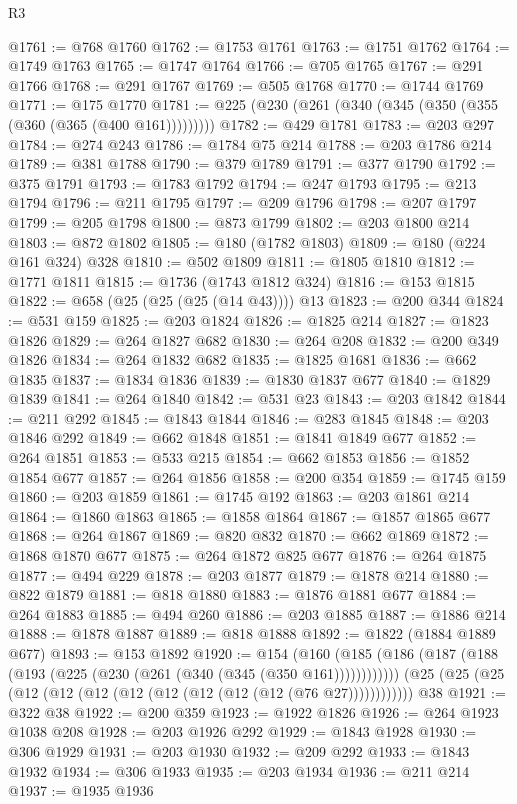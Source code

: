 \begin{lexlean}{R3}
\begin{coremodule}
@1761 := @768 @1760
@1762 := @1753 @1761
@1763 := @1751 @1762
@1764 := @1749 @1763
@1765 := @1747 @1764
@1766 := @705 @1765
@1767 := @291 @1766
@1768 := @291 @1767
@1769 := @505 @1768
@1770 := @1744 @1769
@1771 := @175 @1770
@1781 := @225 (@230 (@261 (@340 (@345 (@350 (@355 (@360 (@365 (@400 @161)))))))))
@1782 := @429 @1781
@1783 := @203 @297
@1784 := @274 @243
@1786 := @1784 @75 @214
@1788 := @203 @1786 @214
@1789 := @381 @1788
@1790 := @379 @1789
@1791 := @377 @1790
@1792 := @375 @1791
@1793 := @1783 @1792
@1794 := @247 @1793
@1795 := @213 @1794
@1796 := @211 @1795
@1797 := @209 @1796
@1798 := @207 @1797
@1799 := @205 @1798
@1800 := @873 @1799
@1802 := @203 @1800 @214
@1803 := @872 @1802
@1805 := @180 (@1782 @1803)
@1809 := @180 (@224 @161 @324) @328
@1810 := @502 @1809
@1811 := @1805 @1810
@1812 := @1771 @1811
@1815 := @1736 (@1743 @1812 @324)
@1816 := @153 @1815
@1822 := @658 (@25 (@25 (@25 (@14 @43)))) @13
@1823 := @200 @344
@1824 := @531 @159
@1825 := @203 @1824
@1826 := @1825 @214
@1827 := @1823 @1826
@1829 := @264 @1827 @682
@1830 := @264 @208
@1832 := @200 @349 @1826
@1834 := @264 @1832 @682
@1835 := @1825 @1681
@1836 := @662 @1835
@1837 := @1834 @1836
@1839 := @1830 @1837 @677
@1840 := @1829 @1839
@1841 := @264 @1840
@1842 := @531 @23
@1843 := @203 @1842
@1844 := @211 @292
@1845 := @1843 @1844
@1846 := @283 @1845
@1848 := @203 @1846 @292
@1849 := @662 @1848
@1851 := @1841 @1849 @677
@1852 := @264 @1851
@1853 := @533 @215
@1854 := @662 @1853
@1856 := @1852 @1854 @677
@1857 := @264 @1856
@1858 := @200 @354
@1859 := @1745 @159
@1860 := @203 @1859
@1861 := @1745 @192
@1863 := @203 @1861 @214
@1864 := @1860 @1863
@1865 := @1858 @1864
@1867 := @1857 @1865 @677
@1868 := @264 @1867
@1869 := @820 @832
@1870 := @662 @1869
@1872 := @1868 @1870 @677
@1875 := @264 @1872 @825 @677
@1876 := @264 @1875
@1877 := @494 @229
@1878 := @203 @1877
@1879 := @1878 @214
@1880 := @822 @1879
@1881 := @818 @1880
@1883 := @1876 @1881 @677
@1884 := @264 @1883
@1885 := @494 @260
@1886 := @203 @1885
@1887 := @1886 @214
@1888 := @1878 @1887
@1889 := @818 @1888
@1892 := @1822 (@1884 @1889 @677)
@1893 := @153 @1892
@1920 := @154
    (@160 (@185 (@186 (@187 (@188 (@193 (@225 (@230 (@261 (@340 (@345 (@350 @161))))))))))))
    (@25 (@25 (@25 (@12 (@12 (@12 (@12 (@12 (@12 (@12 (@12 (@76 @27))))))))))))
    @38
@1921 := @322 @38
@1922 := @200 @359
@1923 := @1922 @1826
@1926 := @264 @1923 @1038 @208
@1928 := @203 @1926 @292
@1929 := @1843 @1928
@1930 := @306 @1929
@1931 := @203 @1930
@1932 := @209 @292
@1933 := @1843 @1932
@1934 := @306 @1933
@1935 := @203 @1934
@1936 := @211 @214
@1937 := @1935 @1936

\end{coremodule}
\end{lexlean}
